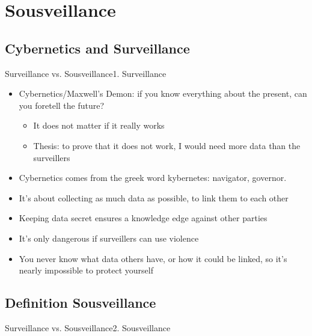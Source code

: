 \documentclass[10pt]{beamer}
\begin{document}
{%
\section{Sousveillance}
\subsection{Cybernetics and Surveillance}
\begin{frame}{Surveillance vs. Sousveillance}{1. Surveillance}

\begin{itemize}
  \item<1-> Cybernetics/Maxwell's Demon: if you know everything about the present, can you foretell the future?
  \begin{itemize}
    \item<2-> It does not matter if it really works
    \item<2-> Thesis: to prove that it does not work, I would need more data than the surveillers
  \end{itemize}
  \item<3-> Cybernetics comes from the greek word kybernetes: navigator, governor.
  \item<3-> It's about collecting as much data as possible, to link them to each other
  \item<3-> Keeping data secret ensures a knowledge edge against other parties
  \item<4-> It's only dangerous if surveillers can use violence
  \item<4-> You never know what data others have, or how it could be linked, so it's nearly impossible to protect yourself
\end{itemize}

\end{frame}

\subsection{Definition Sousveillance}
\begin{frame}{Surveillance vs. Sousveillance}{2. Sousveillance}


\end{frame}}
\end{document}
